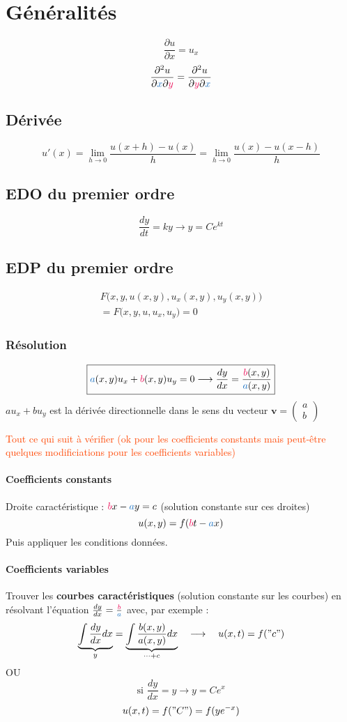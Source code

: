 \documentclass[resume]{subfiles}
\begin{document}
\section{Généralités}
$$\boxed{\frac{\partial u}{\partial x}=u_x}$$
$$\frac{\partial^2 u}{\partial \textcolor{RoyalBlue}{x}\partial \textcolor{OrangeRed}{y}}=\frac{\partial^2 u}{\partial \textcolor{OrangeRed}{y}\partial \textcolor{RoyalBlue}{x}}$$
\subsection{Dérivée}
$$u'(x)=\lim_{h\to 0}\frac{u(x+h)-u(x)}{h}=\lim_{h\to 0}\frac{u(x)-u(x-h)}{h}$$
\subsection{EDO du premier ordre}
$$\boxed{\frac{dy}{dt}=ky\longrightarrow y=Ce^{kt}}$$
\subsection{EDP du premier ordre}
\begin{multline*}
F\Big(x,y,u(x,y),u_x(x,y),u_y(x,y)\Big)\\=F\Big(x,y,u,u_x,u_y\Big)=0
\end{multline*}
\subsubsection{Résolution}
$$\boxed{\textcolor{RoyalBlue}{a}(x,y)u_x+\textcolor{OrangeRed}{b}(x,y)u_y=0\longrightarrow \frac{dy}{dx}=\frac{\textcolor{OrangeRed}{b}(x,y)}{\textcolor{RoyalBlue}{a}(x,y)}}$$
$au_x+bu_y$ est la dérivée directionnelle dans le sens du vecteur $\mathbf{v}=\begin{pmatrix}a\\b\end{pmatrix}$

\textcolor{OrangeRed}{Tout ce qui suit à vérifier (ok pour les coefficients constants mais peut-être quelques modificiations pour les coefficients variables)}
\paragraph{Coefficients constants}
Droite caractéristique : $\textcolor{OrangeRed}{b}x-\textcolor{RoyalBlue}{a}y=c$ (solution constante sur ces droites)
$$u(x,y)=f(\textcolor{OrangeRed}{b}t-\textcolor{RoyalBlue}{a}x)$$
Puis appliquer les conditions données.
\paragraph{Coefficients variables}
Trouver les \textbf{courbes caractéristiques} (solution constante sur les courbes) en résolvant l'équation $\frac{dy}{dx}=\frac{\textcolor{OrangeRed}{b}}{\textcolor{RoyalBlue}{a}}$ avec, par exemple :
$$\underbrace{\int \frac{dy}{dx}dx}_{y}=\underbrace{\int \frac{b(x,y)}{a(x,y)}dx}_{\cdots + c}\quad \longrightarrow\quad u(x,t)=f("c")$$
OU
$$\text{si }\frac{dy}{dx}=y\longrightarrow y=Ce^{x}$$
$$u(x,t)=f("C")=f(ye^{-x})$$
\end{document}

